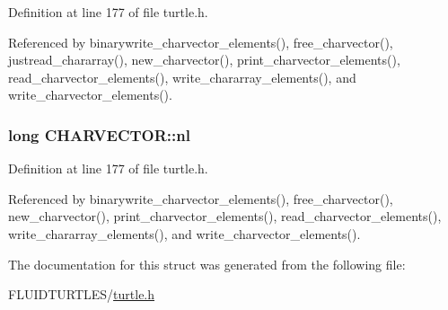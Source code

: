 Definition at line 177 of file turtle.\-h.



Referenced by binarywrite\-\_\-charvector\-\_\-elements(), free\-\_\-charvector(), justread\-\_\-chararray(), new\-\_\-charvector(), print\-\_\-charvector\-\_\-elements(), read\-\_\-charvector\-\_\-elements(), write\-\_\-chararray\-\_\-elements(), and write\-\_\-charvector\-\_\-elements().

\hypertarget{struct_c_h_a_r_v_e_c_t_o_r_ab77e198892be0e921f5fc2acfa04e4f3}{
\subsubsection[{nl}]{\setlength{\rightskip}{0pt plus 5cm}long C\-H\-A\-R\-V\-E\-C\-T\-O\-R\-::nl}}\label{struct_c_h_a_r_v_e_c_t_o_r_ab77e198892be0e921f5fc2acfa04e4f3}


Definition at line 177 of file turtle.\-h.



Referenced by binarywrite\-\_\-charvector\-\_\-elements(), free\-\_\-charvector(), new\-\_\-charvector(), print\-\_\-charvector\-\_\-elements(), read\-\_\-charvector\-\_\-elements(), write\-\_\-chararray\-\_\-elements(), and write\-\_\-charvector\-\_\-elements().



The documentation for this struct was generated from the following file\-:\begin{DoxyCompactItemize}
\item 
F\-L\-U\-I\-D\-T\-U\-R\-T\-L\-E\-S/\hyperlink{turtle_8h}{turtle.\-h}\end{DoxyCompactItemize}
